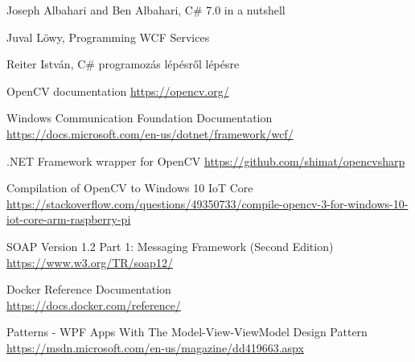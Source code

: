 \begin{thebibliography}{4}

Joseph Albahari and Ben Albahari, C\# 7.0 in a nutshell 

Juval Löwy, Programming WCF Services

 Reiter István, C\# programozás lépésről lépésre 

 OpenCV documentation \url{https://opencv.org/}

 Windows Communication Foundation Documentation \url{https://docs.microsoft.com/en-us/dotnet/framework/wcf/}

 .NET Framework wrapper for OpenCV \url{https://github.com/shimat/opencvsharp}

 Compilation of OpenCV to Windows 10 IoT Core \\ \url{https://stackoverflow.com/questions/49350733/compile-opencv-3-for-windows-10-iot-core-arm-raspberry-pi}

 SOAP Version 1.2 Part 1: Messaging Framework (Second Edition) \\ 
\url{https://www.w3.org/TR/soap12/}

 Docker Reference Documentation \\ \url{https://docs.docker.com/reference/}

 Patterns - WPF Apps With The Model-View-ViewModel Design Pattern \\ \url{https://msdn.microsoft.com/en-us/magazine/dd419663.aspx}
\end{thebibliography}

